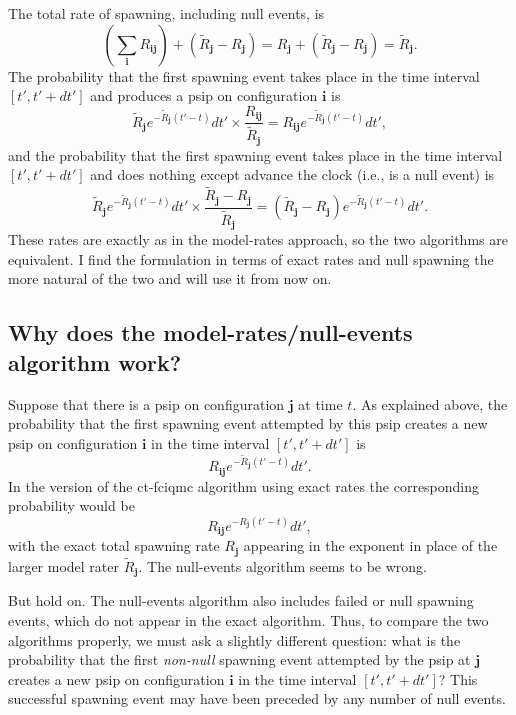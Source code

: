 \documentclass[a4paper, 11pt]{article}
\newcommand{\bi}{\mathbf{i}}
\newcommand{\bj}{\mathbf{j}}
\begin{document}
The total rate of spawning, including null events, is
\begin{equation*}
  \left ( \sum_{\bi} R_{\bi\bj} \right ) 
  + \left ( \tilde{R}_{\bj} - R_{\bj} \right ) 
  = R_{\bj} + \left ( \tilde{R}_{\bj} - R_{\bj} \right ) = \tilde{R}_{\bj}.
\end{equation*}
The probability that the first spawning event takes place in the time
interval $[t',t'+dt']$ and produces a psip on configuration $\bi$ is
\begin{equation*}
  \tilde{R}_{\bj} e^{-\tilde{R}_{\bj}(t'-t)} dt' \times
  \frac{R_{\bi\bj}}{\tilde{R}_{\bj}} = R_{\bi\bj}
  e^{-\tilde{R}_{\bj}(t'-t)} dt',
\end{equation*}
and the probability that the first spawning event takes place in the
time interval $[t',t'+dt']$ and does nothing except advance the clock
(i.e., is a null event) is
\begin{equation*}
  \tilde{R}_{\bj} e^{-\tilde{R}_{\bj}(t'-t)} dt' \times 
  \frac{\tilde{R}_{\bj} - R_{\bj}}{\tilde{R}_{\bj}} =
  \left ( \tilde{R}_{\bj} - R_{\bj} \right ) e^{-\tilde{R}_{\bj}(t'-t)}
  dt' .
\end{equation*}
These rates are exactly as in the model-rates approach, so the two
algorithms are equivalent.  I find the formulation in terms of exact
rates and null spawning the more natural of the two and will use it from
now on.

\subsection*{Why does the model-rates/null-events algorithm work?}

Suppose that there is a psip on configuration $\bj$ at time $t$.  As
explained above, the probability that the first spawning event attempted
by this psip creates a new psip on configuration $\bi$ in the time
interval $[t',t'+dt']$ is
\begin{equation*}
R_{\bi\bj} e^{-\tilde{R}_{\bj}(t'-t)} dt' .
\end{equation*}
In the version of the ct-fciqmc algorithm using exact rates the
corresponding probability would be
\begin{equation*}
R_{\bi\bj} e^{-R_{\bj}(t'-t)} dt' ,
\end{equation*}
with the exact total spawning rate $R_{\bj}$ appearing in the exponent
in place of the larger model rater $\tilde{R}_{\bj}$. The null-events
algorithm seems to be wrong.

But hold on. The null-events algorithm also includes failed or null
spawning events, which do not appear in the exact algorithm. Thus, to
compare the two algorithms properly, we must ask a slightly different
question: what is the probability that the first \emph{non-null}
spawning event attempted by the psip at $\bj$ creates a new psip on
configuration $\bi$ in the time interval $[t',t'+dt']$? This successful
spawning event may have been preceded by any number of null events.
\end{document}
